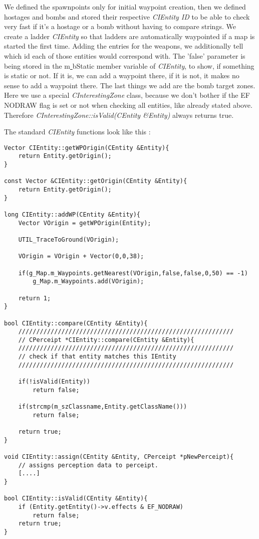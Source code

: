 \documentclass[12pt]{article}
\begin{document}
We defined the spawnpoints only for initial waypoint creation, then we defined hostages and bombs and stored their respective \textit{CIEntity ID} to be able to check very fast if it's a hostage or a bomb without having to compare strings. We create a ladder \textit{CIEntity} so that ladders are automatically waypointed if a map is started the first time. Adding the entries for the weapons, we additionally tell which id each of those entities would correspond with. The 'false' parameter is being stored in the m\underline{ }bStatic member variable of \textit{CIEntity}, to show, if something is static or not. If it is, we can add a waypoint there, if it is not, it makes no sense to add a waypoint there. The last things we add are the bomb target zones. Here we use a special \textit{CInterestingZone} class, because we don't bother if the EF\underline{ }NODRAW flag is set or not when checking all entities, like already stated above. Therefore \textit{\mbox{CInterestingZone}::isValid(CEntity \&Entity)} always returns true.

The standard \textit{CIEntity} functions look like this :
\linespread{1.0}
\scriptsize
\begin{verbatim}
Vector CIEntity::getWPOrigin(CEntity &Entity){
    return Entity.getOrigin();
}

const Vector &CIEntity::getOrigin(CEntity &Entity){
    return Entity.getOrigin();
}

long CIEntity::addWP(CEntity &Entity){
    Vector VOrigin = getWPOrigin(Entity);

    UTIL_TraceToGround(VOrigin);
					
    VOrigin = VOrigin + Vector(0,0,38);

    if(g_Map.m_Waypoints.getNearest(VOrigin,false,false,0,50) == -1)
        g_Map.m_Waypoints.add(VOrigin);

    return 1;
}

bool CIEntity::compare(CEntity &Entity){
    ////////////////////////////////////////////////////////////
    // CPerceipt *CIEntity::compare(CEntity &Entity){
    ////////////////////////////////////////////////////////////
    // check if that entity matches this IEntity
    ////////////////////////////////////////////////////////////

    if(!isValid(Entity))
        return false;

    if(strcmp(m_szClassname,Entity.getClassName()))
        return false;

    return true;
}

void CIEntity::assign(CEntity &Entity, CPerceipt *pNewPerceipt){
    // assigns perception data to perceipt.
    [....]
}

bool CIEntity::isValid(CEntity &Entity){
    if (Entity.getEntity()->v.effects & EF_NODRAW)
        return false;
    return true;
}

\end{verbatim}
\linespread{1.3}
\normalsize
\end{document}
